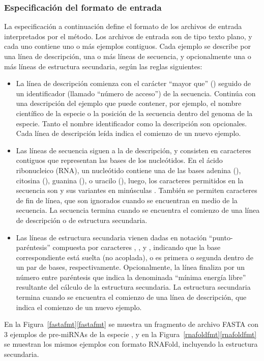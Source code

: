 %
%
\subsubsection{Especificación del formato de entrada}
%
La especificación a continuación define el formato de los archivos de
entrada interpretados por el método.
Los archivos de entrada son de tipo texto plano, y cada uno
contiene uno o más ejemplos contiguos.
Cada ejemplo se describe por una línea de descripción, una o más
líneas de secuencia, y opcionalmente una o más líneas de estructura
secundaria, según las reglas siguientes:
%
\begin{itemize}
\item
  La línea de descripción comienza con el carácter ``mayor que''
  (\mono{>}) seguido de un identificador (llamado ``número de
  acceso'') de la secuencia.
  Continúa con una descripción del ejemplo que puede contener, por
  ejemplo, el nombre científico de la especie o la posición de la
  secuencia dentro del genoma de la especie.
  Tanto el nombre identificador como la descripción son opcionales.
  Cada línea de descripción leída indica el comienzo de un nuevo
  ejemplo.
\item
  Las líneas de secuencia siguen a la de descripción, y consisten en
  caracteres contiguos que representan las bases de los nucleótidos.
  En el ácido ribonucleico (RNA), un nucleótido contiene una de las
  bases adenina (), citosina (), guanina (), o
  uracilo (), luego, los caracteres permitidos en la secuencia
  son  y sus variantes en minúsculas .
  También se permiten caracteres de fin de línea, que son ignorados
  cuando se encuentran en medio de la secuencia.
  La secuencia termina cuando se encuentra el comienzo de una línea de
  descripción o de estructura secundaria.
\item
  Las líneas de estructura secundaria vienen dadas en notación
  ``punto-paréntesis'' compuesta por caracteres , \mono{(}, y
  \mono{)}, indicando que la base correspondiente está suelta
  (no acoplada), o es primera o segunda dentro de un par de bases,
  respectivamente.
  Opcionalmente, la línea finaliza por un número entre paréntesis que
  indica la denominada ``mínima energía libre'' resultante del cálculo
  de la estructura secundaria.
  La estructura secundaria termina cuando se encuentra el comienzo de
  una línea de descripción, que indica el comienzo de un nuevo
  ejemplo.
\end{itemize}
%
En la \iflatexml{}Figura~\ref{fastafmt}\else\autoref{fastafmt}\fi{} se
muestra un fragmento de archivo FASTA con 3 ejemplos de pre-miRNAs de
la especie , y en la
\iflatexml{}Figura~\ref{rnafoldfmt}\else\autoref{rnafoldfmt}\fi{} se
muestran los mismos ejemplos con formato RNAFold, incluyendo la
estructura secundaria.
